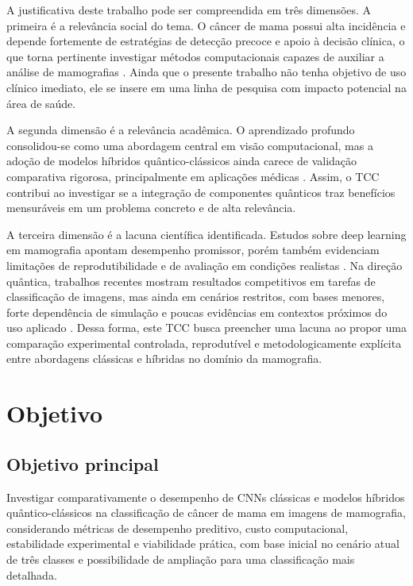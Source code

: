 \documentclass[
    12pt,
    openright,
    oneside,
    a4paper,
    english,
    brazil
]{abntex2}
\begin{document}
A justificativa deste trabalho pode ser compreendida em três dimensões. A primeira é a relevância social do tema. O câncer de mama possui alta incidência e depende fortemente de estratégias de detecção precoce e apoio à decisão clínica, o que torna pertinente investigar métodos computacionais capazes de auxiliar a análise de mamografias \cite{WHO2025BreastCancer}. Ainda que o presente trabalho não tenha objetivo de uso clínico imediato, ele se insere em uma linha de pesquisa com impacto potencial na área de saúde.

A segunda dimensão é a relevância acadêmica. O aprendizado profundo consolidou-se como uma abordagem central em visão computacional, mas a adoção de modelos híbridos quântico-clássicos ainda carece de validação comparativa rigorosa, principalmente em aplicações médicas \cite{LeCun2015,Gupta2025QMLDigitalHealth}. Assim, o TCC contribui ao investigar se a integração de componentes quânticos traz benefícios mensuráveis em um problema concreto e de alta relevância.

A terceira dimensão é a lacuna científica identificada. Estudos sobre deep learning em mamografia apontam desempenho promissor, porém também evidenciam limitações de reprodutibilidade e de avaliação em condições realistas \cite{Bhalla2023MammographyReview}. Na direção quântica, trabalhos recentes mostram resultados competitivos em tarefas de classificação de imagens, mas ainda em cenários restritos, com bases menores, forte dependência de simulação e poucas evidências em contextos próximos do uso aplicado \cite{Long2025QCQCNN}. Dessa forma, este TCC busca preencher uma lacuna ao propor uma comparação experimental controlada, reprodutível e metodologicamente explícita entre abordagens clássicas e híbridas no domínio da mamografia.

\chapter{Objetivo}
\label{sec:objetivo}


\section{Objetivo principal}
\label{subsec:objetivo_principal}

Investigar comparativamente o desempenho de CNNs clássicas e modelos híbridos quântico-clássicos na classificação de câncer de mama em imagens de mamografia, considerando métricas de desempenho preditivo, custo computacional, estabilidade experimental e viabilidade prática, com base inicial no cenário atual de três classes e possibilidade de ampliação para uma classificação mais detalhada.
\end{document}
